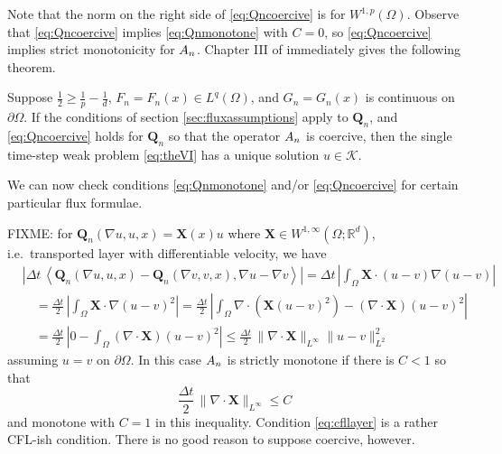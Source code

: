 \documentclass[final,leqno,onefignum,onetabnum]{siamltex1213bueler}
\newcommand\bQ{\mathbf{Q}}
\newcommand\bX{\mathbf{X}}
\newcommand{\Div}{\nabla\cdot}
\renewcommand{\grad}{\nabla}
\newcommand{\ip}[2]{\ensuremath{\left<#1,#2\right>}}
\newcommand\RR{\mathbb{R}}
\begin{document}
Note that the norm on the right side of \eqref{eq:Qncoercive} is for $W^{1,p}(\Omega)$.  Observe that \eqref{eq:Qncoercive} implies \eqref{eq:Qnmonotone} with $C=0$, so \eqref{eq:Qncoercive} implies strict monotonicity for $A_{n}$.  Chapter III of \cite{KinderlehrerStampacchia} immediately gives the following theorem.

\begin{theorem}  \label{thm:firstwellposed}  Suppose $\frac{1}{2} \ge \frac{1}{p} - \frac{1}{d}$, $F_n=F_n(x)\in L^q(\Omega)$, and $G_n=G_n(x)$ is continuous on $\partial \Omega$.  If the conditions of section \ref{sec:fluxassumptions} apply to $\bQ_n$, and \eqref{eq:Qncoercive} holds for $\bQ_n$ so that the operator $A_{n}$ is coercive, then the single time-step weak problem \eqref{eq:theVI} has a unique solution $u\in\mathcal{K}$.
\end{theorem}

We can now check conditions \eqref{eq:Qnmonotone} and/or \eqref{eq:Qncoercive} for certain particular flux formulae.

FIXME: for $\bQ_n(\grad u,u,x) = \bX(x) u$ where $\bX \in W^{1,\infty}(\Omega;\RR^d)$, i.e.~transported layer with differentiable velocity, we have
\begin{align*}
   &\left|\Delta t\,\ip{\bQ_n(\grad u,u,x) - \bQ_n(\grad v,v,x)}{\grad u - \grad v}\right| = \Delta t\,\left|\int_\Omega \bX \cdot (u-v) \grad (u - v)\right| \\
   &\quad = \frac{\Delta t}{2}\,\left|\int_\Omega \bX \cdot \grad (u - v)^2\right| = \frac{\Delta t}{2}\,\left|\int_\Omega \Div(\bX (u - v)^2) - (\Div\bX) (u-v)^2\right| \\
   &\quad = \frac{\Delta t}{2}\,\left|0 - \int_\Omega (\Div\bX) (u-v)^2\right| \le \frac{\Delta t}{2}\,\|\Div\bX\|_{L^\infty} \|u-v\|_{L^2}^2
\end{align*}
assuming $u=v$ on $\partial \Omega$.  In this case $A_{n}$ is strictly monotone if there is $C<1$ so that
\begin{equation}
\frac{\Delta t}{2}\,\|\Div\bX\|_{L^\infty} \le C \label{eq:cfllayer}
\end{equation}
and monotone with $C=1$ in this inequality.  Condition \eqref{eq:cfllayer} is a rather CFL-ish condition.  There is no good reason to suppose coercive, however.
\end{document}
